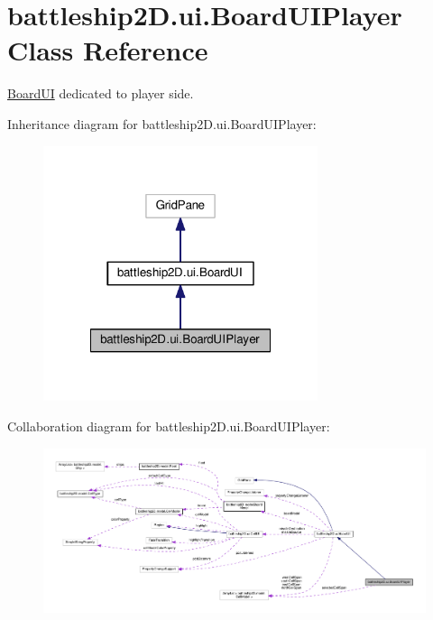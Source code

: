 \hypertarget{classbattleship2D_1_1ui_1_1BoardUIPlayer}{\section{battleship2\-D.\-ui.\-Board\-U\-I\-Player Class Reference}
\label{classbattleship2D_1_1ui_1_1BoardUIPlayer}
}


\hyperlink{classbattleship2D_1_1ui_1_1BoardUI}{Board\-U\-I} dedicated to player side.  




Inheritance diagram for battleship2\-D.\-ui.\-Board\-U\-I\-Player\-:\nopagebreak
\begin{figure}[H]
\begin{center}
\leavevmode
\includegraphics[width=228pt]{classbattleship2D_1_1ui_1_1BoardUIPlayer__inherit__graph}
\end{center}
\end{figure}


Collaboration diagram for battleship2\-D.\-ui.\-Board\-U\-I\-Player\-:\nopagebreak
\begin{figure}[H]
\begin{center}
\leavevmode
\includegraphics[width=350pt]{classbattleship2D_1_1ui_1_1BoardUIPlayer__coll__graph}
\end{center}
\end{figure}
